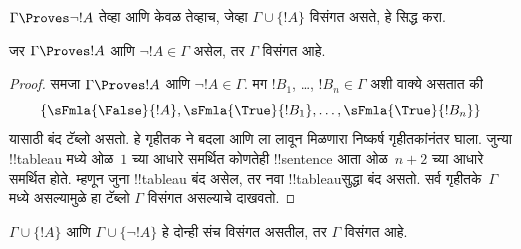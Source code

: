 \documentclass[../../../include/open-logic-section]{subfiles}
\begin{document}
\begin{prob}
$\Gamma \Proves \lnot !A$ तेव्हा आणि केवळ तेव्हाच, जेव्हा $\Gamma \cup \{!A\}$
विसंगत असते, हे सिद्ध करा.
\end{prob}

\begin{prop}
  जर $\Gamma \Proves !A$ आणि $\lnot !A \in \Gamma$ असेल, तर $\Gamma$
  विसंगत आहे.
\end{prop}

\begin{proof}
  समजा $\Gamma \Proves !A$ आणि $\lnot !A \in \Gamma$. मग
  $!B_1$, \dots, $!B_n \in \Gamma$ अशी वाक्ये असतात की
  \[
  \{\sFmla{\False}{!A}, \sFmla{\True}{!B_1}, \dots, \sFmla{\True}{!B_n}\}
  \]
  यासाठी बंद टॅब्लो असतो.  हे गृहीतक
   ने बदला आणि  ला
  \TRule{\True}{\lnot} लावून मिळणारा निष्कर्ष गृहीतकांनंतर घाला. जुन्या
  !!{tableau} मध्ये ओळ~$1$ च्या आधारे समर्थित कोणतेही !!{sentence} आता
  ओळ~$n+2$ च्या आधारे समर्थित होते. म्हणून जुना !!{tableau} बंद असेल, तर
  नवा !!{tableau}सुद्धा बंद असतो. सर्व गृहीतके~$\Gamma$ मध्ये असल्यामुळे हा टॅब्लो
  $\Gamma$ विसंगत असल्याचे दाखवतो.
\end{proof}

\begin{prop}
  $\Gamma \cup \{!A\}$ आणि $\Gamma \cup \{\lnot !A\}$ हे दोन्ही संच
  विसंगत असतील, तर $\Gamma$ विसंगत आहे.
\end{prop}
\end{document}
